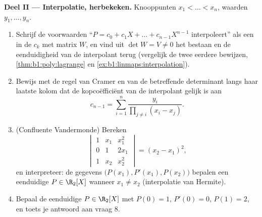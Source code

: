 \begin{problem}
\medskip
\noindent\textbf{Deel II --- Interpolatie, herbekeken.}
Knooppunten $x_1 < \dots < x_n$, waarden $y_1, \dots, y_n$.
\begin{enumerate}[resume]
  \item Schrijf de voorwaarden ``$P = c_0 + c_1X + \dots +
        c_{n-1}X^{n-1}$ interpoleert'' als een  in de
        $c_k$ met matrix $W$, en vind uit $\det W = V \neq 0$ het
        bestaan en de eenduidigheid van de interpolant terug
        (vergelijk de twee eerdere bewijzen,
        \cref{thm:b1:poly:lagrange} en
        \cref{ex:b1:linmaps:interpolation}).
  \item Bewijs met de regel van Cramer en  van
        de betreffende determinant langs haar laatste kolom dat de
        kopcoëfficiënt van de interpolant gelijk is aan
        \[
        c_{n-1} = \sum_{i=1}^{n}
        \frac{y_i}{\prod_{j \neq i}(x_i - x_j)} .
        \]
  \item (Confluente Vandermonde) Bereken
        \[
        \begin{vmatrix}
        1 & x_1 & x_1^2\\
        0 & 1 & 2x_1\\
        1 & x_2 & x_2^2
        \end{vmatrix}
        = (x_2 - x_1)^2 ,
        \]
        en interpreteer: de gegevens $\bigl(P(x_1), P'(x_1),
        P(x_2)\bigr)$ bepalen een eenduidige $P \in \R_2[X]$
        wanneer $x_1 \neq x_2$ (interpolatie van Hermite).
  \item Bepaal de eenduidige $P \in \R_2[X]$ met $P(0) = 1$, $P'(0)
        = 0$, $P(1) = 2$, en toets je antwoord aan vraag 8.
\end{enumerate}


\end{problem}
